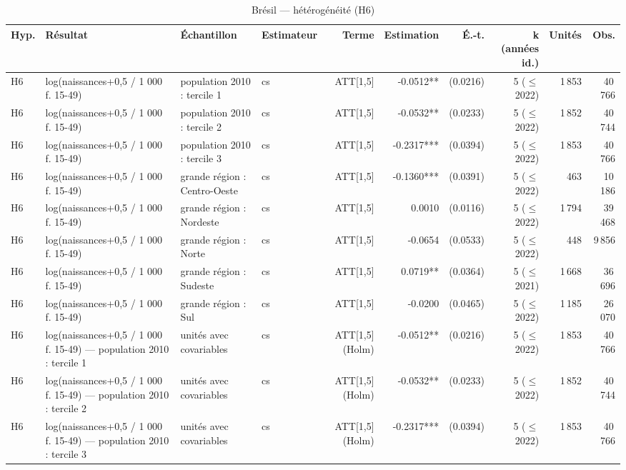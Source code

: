 \begin{table}\centering
\begin{threeparttable}
\caption{Brésil — hétérogénéité (H6)}\label{tab:br_h6}
\scriptsize
\begin{tabular}{lp{7.5cm}llrrrrrr}
\toprule
Hyp. & Résultat & Échantillon & Estimateur & Terme & Estimation & É.-t. & k (années id.) & Unités & Obs. \\
\midrule
H6 & log(naissances+0,5 / 1 000 f. 15-49) & population 2010 : tercile 1 & cs & ATT[1,5] & -0.0512** & (0.0216) & 5 ($\leq$ 2022) & 1\,853 & 40\,766 \\
H6 & log(naissances+0,5 / 1 000 f. 15-49) & population 2010 : tercile 2 & cs & ATT[1,5] & -0.0532** & (0.0233) & 5 ($\leq$ 2022) & 1\,852 & 40\,744 \\
H6 & log(naissances+0,5 / 1 000 f. 15-49) & population 2010 : tercile 3 & cs & ATT[1,5] & -0.2317*** & (0.0394) & 5 ($\leq$ 2022) & 1\,853 & 40\,766 \\
H6 & log(naissances+0,5 / 1 000 f. 15-49) & grande région : Centro-Oeste & cs & ATT[1,5] & -0.1360*** & (0.0391) & 5 ($\leq$ 2022) & 463 & 10\,186 \\
H6 & log(naissances+0,5 / 1 000 f. 15-49) & grande région : Nordeste & cs & ATT[1,5] & 0.0010 & (0.0116) & 5 ($\leq$ 2022) & 1\,794 & 39\,468 \\
H6 & log(naissances+0,5 / 1 000 f. 15-49) & grande région : Norte & cs & ATT[1,5] & -0.0654 & (0.0533) & 5 ($\leq$ 2022) & 448 & 9\,856 \\
H6 & log(naissances+0,5 / 1 000 f. 15-49) & grande région : Sudeste & cs & ATT[1,5] & 0.0719** & (0.0364) & 5 ($\leq$ 2021) & 1\,668 & 36\,696 \\
H6 & log(naissances+0,5 / 1 000 f. 15-49) & grande région : Sul & cs & ATT[1,5] & -0.0200 & (0.0465) & 5 ($\leq$ 2022) & 1\,185 & 26\,070 \\
H6 & log(naissances+0,5 / 1 000 f. 15-49) — population 2010 : tercile 1 & unités avec covariables & cs & ATT[1,5] (Holm) & -0.0512** & (0.0216) & 5 ($\leq$ 2022) & 1\,853 & 40\,766 \\
H6 & log(naissances+0,5 / 1 000 f. 15-49) — population 2010 : tercile 2 & unités avec covariables & cs & ATT[1,5] (Holm) & -0.0532** & (0.0233) & 5 ($\leq$ 2022) & 1\,852 & 40\,744 \\
H6 & log(naissances+0,5 / 1 000 f. 15-49) — population 2010 : tercile 3 & unités avec covariables & cs & ATT[1,5] (Holm) & -0.2317*** & (0.0394) & 5 ($\leq$ 2022) & 1\,853 & 40\,766 \\

\end{tabular}
\end{threeparttable}
\end{table}
